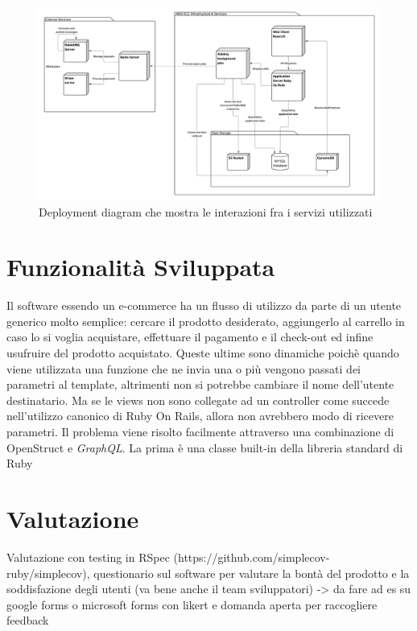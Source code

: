 \documentclass[target=bach,aauheader=,style=]{thud}
\begin{document}
\begin{figure}[h]
\centering
\includegraphics[width=1\linewidth]{Deployment Diagram.png}
\caption{Deployment diagram che mostra le interazioni fra i servizi utilizzati}
\label{fig:dep_diagram}
\end{figure}

\chapter{Funzionalità Sviluppata}

Il software essendo un e-commerce ha un flusso di utilizzo da parte di un utente generico molto semplice: cercare il prodotto desiderato,
aggiungerlo al carrello in caso lo si voglia acquistare, effettuare il pagamento e il check-out ed infine usufruire del prodotto acquistato.
Queste ultime sono dinamiche poichè quando viene utilizzata una funzione che ne invia una o più vengono passati dei parametri al template, altrimenti non si
potrebbe cambiare il nome dell'utente destinatario. Ma se le views non sono collegate ad un controller come succede nell'utilizzo canonico di Ruby On Rails, allora
non avrebbero modo di ricevere parametri. Il problema viene risolto facilmente attraverso una combinazione di OpenStruct e \textit{GraphQL}.
La prima è una classe built-in della libreria standard di Ruby

\chapter{Valutazione}

Valutazione con testing in RSpec (https://github.com/simplecov-ruby/simplecov), questionario sul software per valutare
la bontà del prodotto e la soddisfazione degli utenti (va bene anche il team sviluppatori) -> da fare ad es su google forms o
microsoft forms con likert e domanda aperta per raccogliere feedback
\end{document}
